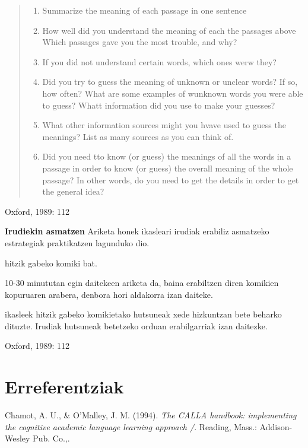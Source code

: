 \documentclass[]{book}
\providecommand{\tightlist}{%
  \setlength{\itemsep}{0pt}\setlength{\parskip}{0pt}}
\begin{document}
\begin{quote}
\begin{enumerate}
\def\labelenumi{\arabic{enumi}.}
\tightlist
\item
  Summarize the meaning of each passage in one sentence
\item
  How well did you understand the meaning of each the passages above
  Which passages gave you the most trouble, and why?
\item
  If you did not understand certain words, which ones werw they?
\item
  Did you try to guess the meaning of unknown or unclear words?
  If so, how often?
  What are some examples of wunknown words you were able to guess?
  Whatt information did you use to make your guesses?
\item
  What other information sources might you hvave used to guess the meanings?
  List as many sources as you can think of.
\item
  Did you need tto know (or guess) the meanings of all the words in a passage in order to know (or guess) the overall meaning of the whole passage? In other words, do you need to get the details in order to get the general idea?
\end{enumerate}
\end{quote}

Oxford, 1989: 112

\textbf{Irudiekin asmatzen}
Ariketa honek ikasleari irudiak erabiliz asmatzeko estrategiak praktikatzen lagunduko dio.

\begin{description}
\tightlist
\item[Baliabide materiala]
hitzik gabeko komiki bat.
\item[Denbora]
10-30 minututan egin daitekeen ariketa da, baina erabiltzen diren komikien kopuruaren arabera, denbora hori aldakorra izan daiteke.
\item[Nola egin]
ikasleek hitzik gabeko komikietako hutsuneak xede hizkuntzan bete beharko dituzte. Irudiak hutsuneak betetzeko orduan erabilgarriak izan daitezke.
\end{description}

Oxford, 1989: 112

\hypertarget{erreferentziak-1}{%
\section{Erreferentziak}\label{erreferentziak-1}}

Chamot, A. U., \& O'Malley, J. M. (1994). \emph{The CALLA handbook: implementing the cognitive academic language learning approach /}. Reading, Mass.: Addison-Wesley Pub. Co.,.
\end{document}
